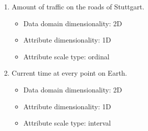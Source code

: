 \documentclass[a4paper]{article}
\begin{document}
\begin{enumerate}
		\item Amount of traffic on the roads of Stuttgart.
		\begin{itemize}
			\item Data domain dimensionality: 2D %
			\item Attribute dimensionality: 1D %
			\item Attribute scale type: ordinal
		\end{itemize}
		\item Current time at every point on Earth.
		\begin{itemize}
			\item Data domain dimensionality: 2D %
			\item Attribute dimensionality: 1D %
			\item Attribute scale type: interval %
		\end{itemize}
		
	\end{enumerate}
	
	
	\newpage
\end{document}
